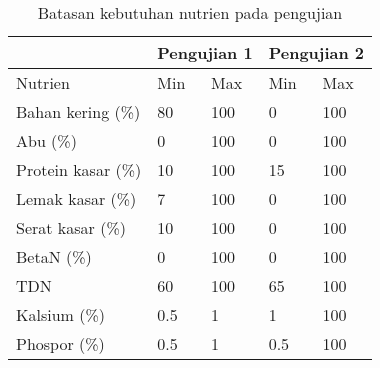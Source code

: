 \begin{table}[h!]
	\centering
	\caption{Batasan kebutuhan nutrien pada pengujian}
	\label{my-label}
	\begin{tabular}{p{3.5cm}p{0.5cm}p{0.5cm}p{0.5cm}p{0.5cm}}
		\hline
		&\multicolumn{2}{c}{Pengujian 1} & \multicolumn{2}{c}{Pengujian 2} \\ \hline
		Nutrien            & Min         & Max & Min & Max \\ \hline
		Bahan kering (\%)  & 80          & 100 & 0   & 100 \\
		Abu (\%)           & 0           & 100 & 0   & 100 \\
		Protein kasar (\%) & 10          & 100 & 15  & 100 \\
		Lemak kasar (\%)   & 7           & 100 & 0   & 100 \\
		Serat kasar (\%)   & 10          & 100 & 0   & 100 \\
		BetaN (\%)         & 0           & 100 & 0   & 100 \\
		TDN                & 60          & 100 & 65  & 100 \\
		Kalsium (\%)       & 0.5         & 1   & 1   & 100 \\
		Phospor (\%)       & 0.5         & 1   & 0.5 & 100 \\ \hline
	\end{tabular}
\end{table}

